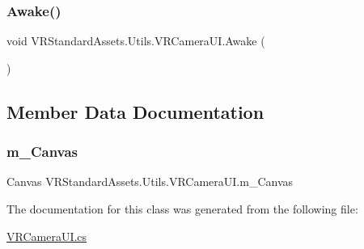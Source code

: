 \subsubsection{\texorpdfstring{Awake()}{Awake()}}
{\footnotesize\ttfamily void V\+R\+Standard\+Assets.\+Utils.\+V\+R\+Camera\+U\+I.\+Awake (\begin{DoxyParamCaption}{ }\end{DoxyParamCaption})\hspace{0.3cm}{\ttfamily [private]}}



\subsection{Member Data Documentation}
\mbox{\label{class_v_r_standard_assets_1_1_utils_1_1_v_r_camera_u_i_afef7aad14b8afe269014143749aa2622}} 
\subsubsection{\texorpdfstring{m\+\_\+\+Canvas}{m\_Canvas}}
{\footnotesize\ttfamily Canvas V\+R\+Standard\+Assets.\+Utils.\+V\+R\+Camera\+U\+I.\+m\+\_\+\+Canvas\hspace{0.3cm}{\ttfamily [private]}}



The documentation for this class was generated from the following file\+:\begin{DoxyCompactItemize}
\item 
\mbox{\hyperlink{_v_r_camera_u_i_8cs}{V\+R\+Camera\+U\+I.\+cs}}\end{DoxyCompactItemize}
